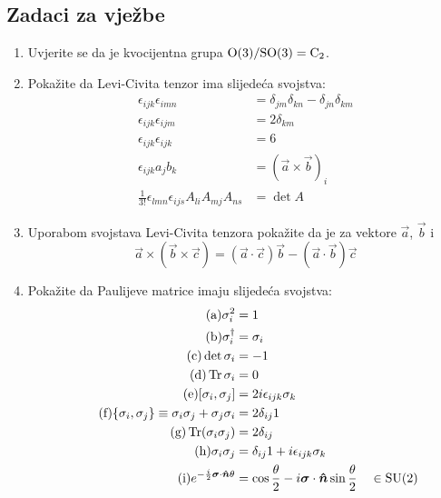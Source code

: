 \subsection*{Zadaci za vježbe}

\begin{enumerate}[label=\arabic{chapter}.\arabic*.]

\item \label{zad:O3oSO3} Uvjerite se da je kvocijentna grupa $\mathrm{O}(3)/\mathrm{SO}(3) = \mathrm{C}_{2}$.

\item \label{zad:svojstvalevicivite} Pokažite da Levi-Civita tenzor ima slijedeća svojstva:
\begin{align*}
\tag{a}\epsilon_{ijk}\epsilon_{imn}&=\delta_{jm}\delta_{kn}-\delta_{jn}\delta_{km}\\
\tag{b}\epsilon_{ijk}\epsilon_{ijm}&=2\delta_{km} \\
\tag{c}\epsilon_{ijk}\epsilon_{ijk}&=6 \\
\tag{d}\epsilon_{ijk}a_j b_k &= (\vec{a}\times\vec{b})_i  \\
\tag{e}\frac{1}{3!}\epsilon_{lmn} \epsilon_{ijs} A_{li} A_{mj} A_{ns} &= \det A
\end{align*}

\item Uporabom svojstava Levi-Civita tenzora pokažite da je
za vektore $\vec{a}$, $\vec{b}$ i 
\begin{displaymath}
    \vec{a}\times(\vec{b}\times\vec{c})=(\vec{a}\cdot\vec{c})\vec{b}
 -(\vec{a}\cdot\vec{b})\vec{c}
\end{displaymath}

\item \label{zad:svojstvapaulijevih} Pokažite da Paulijeve matrice imaju slijedeća svojstva:
\begin{align*}
\tag{a} \sigma_{i}^2 &= 1 \\
\tag{b} \sigma_{i}^\dagger &= \sigma_i \\
\tag{c} \det \sigma_i &= -1 \\
\tag{d} \Tr \sigma_i &=0 \\
\tag{e} [\sigma_i, \sigma_j] &= 2 i \epsilon_{ijk} \sigma_k \\
\tag{f} \{\sigma_i, \sigma_j\}\equiv \sigma_i\sigma_j + \sigma_j \sigma_i &= 2
\delta_{ij} 1 \\
\tag{g} \Tr (\sigma_i \sigma_j) &= 2\delta_{ij} \\
\tag{h} \sigma_i \sigma_j &= \delta_{ij} 1 + i \epsilon_{ijk}\sigma_k\\
\tag{i} e^{-\frac{i}{2}\vec{\sigma}\cdot\unitn \theta} &=
\cos \frac{\theta}{2}-i\vec{\sigma}\cdot\unitn \sin\frac{\theta}{2} \quad\in \SU{2}
\end{align*}


\end{enumerate}
